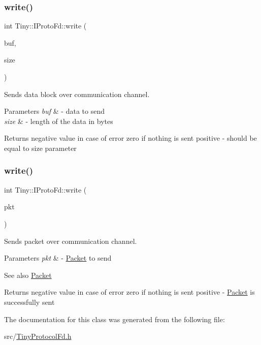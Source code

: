 \subsubsection{\texorpdfstring{write()}{write()}\hspace{0.1cm}{\footnotesize\ttfamily [1/2]}}
{\footnotesize\ttfamily int Tiny\+::\+I\+Proto\+Fd\+::write (\begin{DoxyParamCaption}\item[{char $\ast$}]{buf,  }\item[{int}]{size }\end{DoxyParamCaption})}

Sends data block over communication channel. 
\begin{DoxyParams}{Parameters}
{\em buf} & -\/ data to send \\
\hline
{\em size} & -\/ length of the data in bytes \\
\hline
\end{DoxyParams}
\begin{DoxyReturn}{Returns}
negative value in case of error zero if nothing is sent positive -\/ should be equal to size parameter 
\end{DoxyReturn}
\mbox{\label{classTiny_1_1IProtoFd_aa822a1dec320e6edc70a84699371fe81}} 
\subsubsection{\texorpdfstring{write()}{write()}\hspace{0.1cm}{\footnotesize\ttfamily [2/2]}}
{\footnotesize\ttfamily int Tiny\+::\+I\+Proto\+Fd\+::write (\begin{DoxyParamCaption}\item[{\hyperlink{classTiny_1_1IPacket}{I\+Packet} \&}]{pkt }\end{DoxyParamCaption})}

Sends packet over communication channel. 
\begin{DoxyParams}{Parameters}
{\em pkt} & -\/ \hyperlink{classTiny_1_1Packet}{Packet} to send \\
\hline
\end{DoxyParams}
\begin{DoxySeeAlso}{See also}
\hyperlink{classTiny_1_1Packet}{Packet} 
\end{DoxySeeAlso}
\begin{DoxyReturn}{Returns}
negative value in case of error zero if nothing is sent positive -\/ \hyperlink{classTiny_1_1Packet}{Packet} is successfully sent 
\end{DoxyReturn}


The documentation for this class was generated from the following file\+:\begin{DoxyCompactItemize}
\item 
src/\hyperlink{TinyProtocolFd_8h}{Tiny\+Protocol\+Fd.\+h}\end{DoxyCompactItemize}
